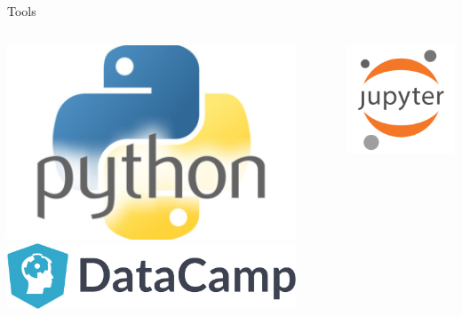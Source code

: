 \documentclass{beamer}
\begin{document}
\begin{frame}{Tools}
  \begin{columns}
    \begin{column}{0.5\textwidth}    
      \includegraphics[width=0.9\textwidth]{img/python-logo.jpg} \\
      \vspace{1cm}
      \includegraphics[width=0.9\textwidth]{img/DataCamp-logo.png}
    \end{column}
    \begin{column}{0.5\textwidth}
      \includegraphics[width=\textwidth]{img/jupyter-logo.png}
    \end{column}
  \end{columns}
\end{frame}
\end{document}
